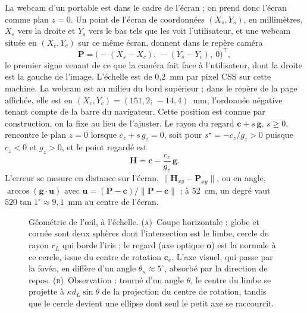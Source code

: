 \documentclass[10pt,a4paper]{article}
\newcommand{\vect}[1]{\symbf{#1}}
\newcommand{\T}{^{\top}}
\begin{document}
La webcam d'un portable est dans le cadre de l'écran ; on prend donc l'écran comme plan $z=0$. Un point de l'écran de coordonnées $(X_s,Y_s)$, en millimètres, $X_s$ vers la droite et $Y_s$ vers le bas tels que les voit l'utilisateur, et une webcam située en $(X_c,Y_c)$ sur ce même écran, donnent dans le repère caméra
\begin{equation}
\vect P=\bigl(-(X_s-X_c),\ -(Y_s-Y_c),\ 0\bigr)\T ,
\end{equation}
le premier signe venant de ce que la caméra fait face à l'utilisateur, dont la droite est la gauche de l'image. L'échelle est de 0,2~mm par pixel CSS sur cette machine. La webcam est au milieu du bord supérieur ; dans le repère de la page affichée, elle est en $(X_c,Y_c)=(151{,}2;\,-14{,}4)$~mm, l'ordonnée négative tenant compte de la barre du navigateur. Cette position est connue par construction, on la fixe au lieu de l'ajuster. Le rayon du regard $\vect c+s\,\vect g$, $s\ge0$, rencontre le plan $z=0$ lorsque $c_z+s\,g_z=0$, soit pour $s^\star=-c_z/g_z>0$ puisque $c_z<0$ et $g_z>0$, et le point regardé est
\begin{equation}\label{eq:hit}
\vect H=\vect c-\frac{c_z}{g_z}\,\vect g .
\end{equation}
L'erreur se mesure en distance sur l'écran, $\|\vect H_{xy}-\vect P_{xy}\|$, ou en angle, $\arccos(\vect g\cdot\vect u)$ avec $\vect u=(\vect P-\vect c)/\|\vect P-\vect c\|$ ; à 52~cm, un degré vaut $520\tan1^\circ\approx9{,}1$~mm au centre de l'écran.

\begin{figure}[!htbp]
\centering

\caption{Géométrie de l'œil, à l'échelle. \textsc{(a)}~Coupe horizontale : globe et cornée sont deux sphères dont l'intersection est le limbe, cercle de rayon $r_L$ qui borde l'iris ; le regard (axe optique $\vect o$) est la normale à ce cercle, issue du centre de rotation $\vect c_e$. L'axe visuel, qui passe par la fovéa, en diffère d'un angle $\theta_\kappa\approx5^\circ$, absorbé par la direction de repos. \textsc{(b)}~Observation : tourné d'un angle $\theta$, le centre du limbe se projette à $\kappa d_L\sin\theta$ de la projection du centre de rotation, tandis que le cercle devient une ellipse dont seul le petit axe se raccourcit.}\label{fig:oeil}
\end{figure}
\end{document}
